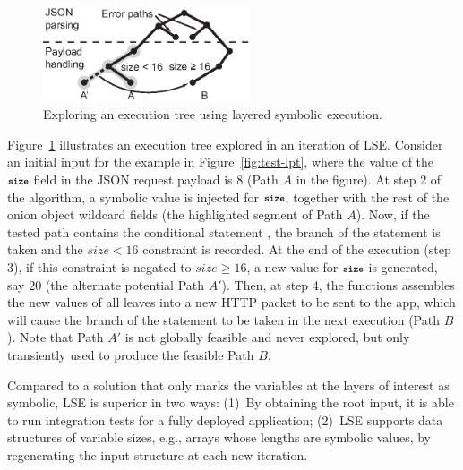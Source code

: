 \begin{figure}
  \centering
  \includegraphics[width=2.4in]{paas/figures/layered-tree}
  \caption{Exploring an execution tree using layered symbolic
    execution.}
  \label{fig:layered-tree}
\end{figure}

Figure~\ref{fig:layered-tree} illustrates an execution tree explored in an iteration of LSE. Consider an initial input for the example in Figure~\ref{fig:test-lpt}, where the value of the $\texttt{\footnotesize \bfseries size}$ field in the JSON request payload is $8$ (Path $A$ in the figure).
%
At step 2 of the algorithm, a symbolic value is injected for $\texttt{\footnotesize \bfseries size}$, together with the rest of the onion object wildcard fields (the highlighted segment of Path $A$).  Now, if the tested path contains the conditional statement , the  branch of the statement is taken and the $\mathit{size} < 16$ constraint is recorded.  At the end of the execution (step 3), if this constraint is negated to $\mathit{size} \geq 16$, a new value for $\texttt{\footnotesize \bfseries size}$ is generated, say $20$ (the alternate potential Path $A'$).  Then, at step 4, the  functions assembles the new values of all leaves into a new HTTP packet to be sent to the app, which will cause the  branch of the  statement to be taken in the next execution (Path $B$).  Note that Path $A'$ is not globally feasible and never explored, but only transiently used to produce the feasible Path $B$.

Compared to a solution that only marks the variables at the layers of interest as symbolic, LSE is superior in two ways: (1)~By obtaining the root input, it is able to run integration tests for a fully deployed application; (2)~LSE supports data structures of variable sizes, e.g., arrays whose lengths are symbolic values, by regenerating the input structure at each new iteration.


